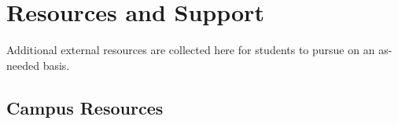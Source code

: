 \documentclass[12pt,a4paper,article,oneside]{memoir} %
\begin{document}



\newpage

\chapter{Resources and Support} \label{sec:resources_and_support}

Additional external resources are collected here for students to pursue on an as-needed basis.


\section{Campus Resources}
\end{document}
